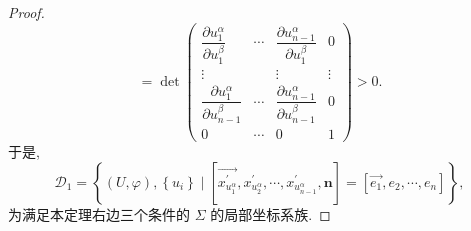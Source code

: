 \begin{proof}
\[  =\operatorname{det}
  \begin{pmatrix}
    \dfrac{\partial u_{1}^{\alpha}}{\partial u_{1}^{\beta}} & \cdots & \dfrac{\partial u_{n-1}^{\alpha}}{\partial u_{1}^{\beta}} & 0 \\
    \vdots & & \vdots & \vdots \\
    \dfrac{\partial u_{1}^{\alpha}}{\partial u_{n-1}^{\beta}} & \cdots & \dfrac{\partial u_{n-1}^{\alpha}}{\partial u_{n-1}^{\beta}} & 0 \\
    0 & \cdots & 0 & 1
  \end{pmatrix}>0.
\]
于是,
\[
  \mathcal{D}_{1}=\left\{(U, \varphi),\left\{u_{i}\right\} \mid\left[\overrightarrow{x_{u_{1}^{\alpha}}^{\prime}}, x_{u_{2}^{\alpha}}^{\prime}, \cdots, x_{u_{n-1}^{\alpha}}^{\prime}, \boldsymbol{n}\right]=\left[\overrightarrow{e_{1}}, e_{2}, \cdots, e_{n}\right]\right\},
\]
为满足本定理右边三个条件的 $\Sigma$ 的局部坐标系族.


\end{proof}
